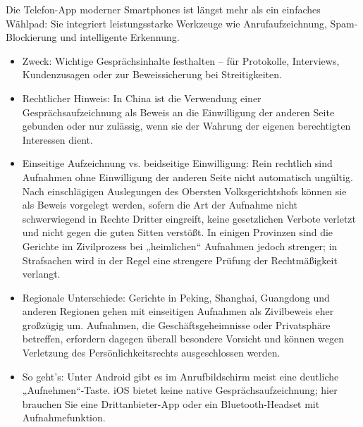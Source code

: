 


Die Telefon-App moderner Smartphones ist längst mehr als ein einfaches Wählpad: Sie integriert leistungsstarke Werkzeuge wie Anrufaufzeichnung, Spam-Blockierung und intelligente Erkennung.


\begin{itemize}
  \item Zweck: Wichtige Gesprächsinhalte festhalten – für Protokolle, Interviews, Kundenzusagen oder zur Beweissicherung bei Streitigkeiten.
  \item Rechtlicher Hinweis: In China ist die Verwendung einer Gesprächsaufzeichnung als Beweis an die Einwilligung der anderen Seite gebunden oder nur zulässig, wenn sie der Wahrung der eigenen berechtigten Interessen dient.
  \item Einseitige Aufzeichnung vs. beidseitige Einwilligung: Rein rechtlich sind Aufnahmen ohne Einwilligung der anderen Seite nicht automatisch ungültig. Nach einschlägigen Auslegungen des Obersten Volksgerichtshofs können sie als Beweis vorgelegt werden, sofern die Art der Aufnahme nicht schwerwiegend in Rechte Dritter eingreift, keine gesetzlichen Verbote verletzt und nicht gegen die guten Sitten verstößt. In einigen Provinzen sind die Gerichte im Zivilprozess bei „heimlichen“ Aufnahmen jedoch strenger; in Strafsachen wird in der Regel eine strengere Prüfung der Rechtmäßigkeit verlangt.
  \item Regionale Unterschiede: Gerichte in Peking, Shanghai, Guangdong und anderen Regionen gehen mit einseitigen Aufnahmen als Zivilbeweis eher großzügig um. Aufnahmen, die Geschäftsgeheimnisse oder Privatsphäre betreffen, erfordern dagegen überall besondere Vorsicht und können wegen Verletzung des Persönlichkeitsrechts ausgeschlossen werden.
  \item So geht's: Unter Android gibt es im Anrufbildschirm meist eine deutliche „Aufnehmen“-Taste. iOS bietet keine native Gesprächsaufzeichnung; hier brauchen Sie eine Drittanbieter-App oder ein Bluetooth-Headset mit Aufnahmefunktion.
\end{itemize}

